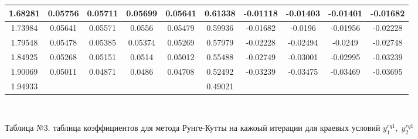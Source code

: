\begin{center}
\begin{table}[htbp]
\begin{tabular}{|c|c|c|c|c|c|c|c|c|c|}
			\hline
			1.68281 & 0.05756 & 0.05711 & 0.05699 & 0.05641 & 0.61338 & -0.01118 & -0.01403 & -0.01401 & -0.01682 \\
			\hline
			1.73984 & 0.05641 & 0.05571 & 0.0556 & 0.05479 & 0.59936 & -0.01682 & -0.0196 & -0.01956 & -0.02228 \\
			\hline
			1.79548 & 0.05478 & 0.05385 & 0.05374 & 0.05269 & 0.57979 & -0.02228 & -0.02494 & -0.0249 & -0.02748 \\
			\hline
			1.84925 & 0.05268 & 0.05151 & 0.0514 & 0.05012 & 0.55488 & -0.02749 & -0.03001 & -0.02995 & -0.03239 \\
			\hline
			1.90069 & 0.05011 & 0.04871 & 0.0486 & 0.04708 & 0.52492 & -0.03239 & -0.03475 & -0.03469 & -0.03695 \\
			\hline
			1.94933 & & & & & 0.49021 &  & & &  \\
			\hline
	\end{tabular}\\
\end{table}
\color{blue}
Таблица №3. таблица коэффициентов для метода Рунге-Кутты на кажоый итерации для краевых условий $ y^{rq1}_{1}, \; y^{rq1}_{2} $ 
\end{center}
